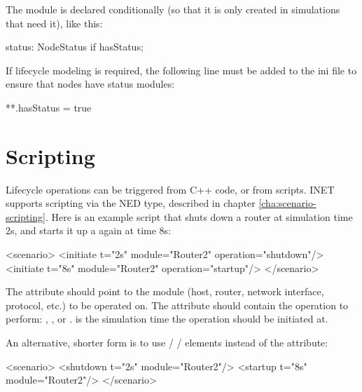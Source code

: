 The  module is declared conditionally (so that it is
only created in simulations that need it), like this:

\begin{ned}
status: NodeStatus if hasStatus;
\end{ned}

If lifecycle modeling is required, the following line must be added
to the ini file to ensure that nodes have status modules:

\begin{inifile}
**.hasStatus = true
\end{inifile}

\section{Scripting}
\label{sec:lifecycle:scripting}

Lifecycle operations can be triggered from C++ code, or from scripts.
INET supports scripting via the  NED type,
described in chapter \ref{cha:scenario-scripting}.
Here is an example script that shuts down a router at simulation
time 2s, and starts it up a again at time 8s:

\begin{XML}
<scenario>
  <initiate t="2s" module="Router2" operation="shutdown"/>
  <initiate t="8s" module="Router2" operation="startup"/>
</scenario>
\end{XML}

The  attribute should point to the module (host, router,
network interface, protocol, etc.) to be operated on.
The  attribute should contain the operation to perform:
, , or .
 is the simulation time the operation should be initiated at.

An alternative, shorter form is to use  /
 /  elements instead of the
 attribute:

\begin{XML}
<scenario>
  <shutdown t="2s" module="Router2"/>
  <startup  t="8s" module="Router2"/>
</scenario>
\end{XML}





